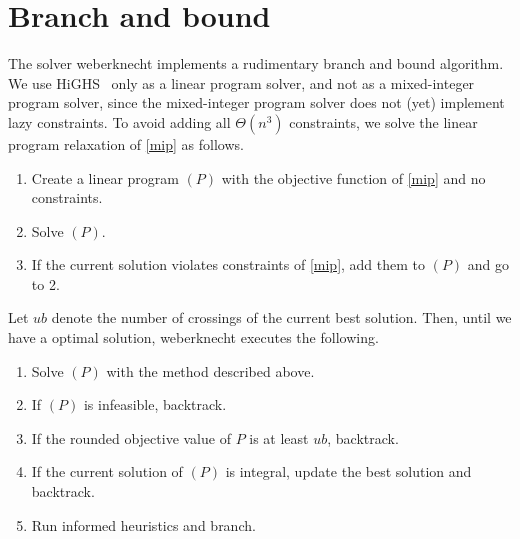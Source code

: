 \documentclass[a4paper,UKenglish,cleveref, autoref, thm-restate]{lipics-v2021}
\begin{document}
\section{Branch and bound}\label{sec:bnb}
The solver \textsf{weberknecht} implements a rudimentary branch and bound algorithm.
We use HiGHS~\cite{huangfu2018parallelizing} only as a linear program solver, and not as a mixed-integer program solver, since the mixed-integer program solver does not (yet) implement lazy constraints.
To avoid adding all $\Theta(n^3)$ constraints, we solve the linear program relaxation of \eqref{mip} as follows.
\begin{enumerate}[1.]
\item Create a linear program $(P)$ with the objective function of \eqref{mip} and no constraints.
\item Solve $(P)$.
\item If the current solution violates constraints of \eqref{mip}, add them to $(P)$ and go to 2.
\end{enumerate}
Let $ub$ denote the number of crossings of the current best solution.
Then, until we have a optimal solution, \textsf{weberknecht} executes the following.
\begin{enumerate}[1.]
\item Solve $(P)$ with the method described above.
\item If $(P)$ is infeasible, backtrack.
\item If the rounded objective value of $P$ is at least $ub$, backtrack.
\item If the current solution of $(P)$ is integral, update the best solution and backtrack.
\item Run informed heuristics and branch.
\end{enumerate}


\end{document}

